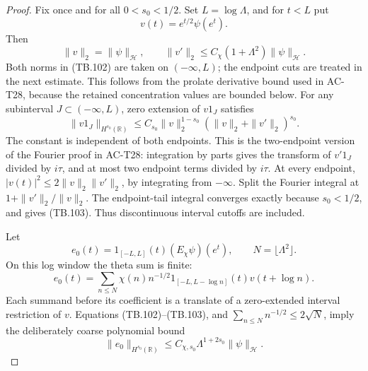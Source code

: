 \begin{proof}
Fix once and for all \(0<s_0<1/2\).
Set \(L=\log\Lambda\), and for \(t<L\) put
\[
             v(t)=e^{t/2}\psi(e^t).
 \]
Then
\[
 \|v\|_2=\|\psi\|_{\mathcal H},\qquad
 \|v'\|_2\leq C_\chi(1+\Lambda^2)\|\psi\|_{\mathcal H}.
 \tag{TB.102}
\]
Both norms in (TB.102) are taken on \((-\infty,L)\);
the endpoint cuts are treated in the next estimate.
This follows from the prolate derivative bound used in
AC-T28, because the retained concentration values are
bounded below.
For any subinterval \(J\subset(-\infty,L)\), zero extension
of \(v1_J\) satisfies
\[
 \|v1_J\|_{H^{s_0}(\mathbb R)}
      \leq C_{s_0}
        \|v\|_2^{1-s_0}(\|v\|_2+\|v'\|_2)^{s_0}.
 \tag{TB.103}
\]
The constant is independent of both endpoints.
This is the two-endpoint version of the Fourier proof
in AC-T28: integration by parts gives the transform of
\(v'1_J\) divided by \(i\tau\), and at most two endpoint
terms divided by \(i\tau\).
At every endpoint,
\(|v(t)|^2\leq2\|v\|_2\|v'\|_2\), by integrating from
\(-\infty\).
Split the Fourier integral at
\(1+\|v'\|_2/\|v\|_2\).
The endpoint-tail integral converges exactly because
\(s_0<1/2\), and gives (TB.103).
Thus discontinuous interval cutoffs are included.

Let
\[
 e_0(t)=1_{[-L,L]}(t)(E_\chi\psi)(e^t),
               \qquad N=\lfloor\Lambda^2\rfloor .
 \]
On this log window the theta sum is finite:
\[
 e_0(t)=\sum_{n\leq N}\chi(n)n^{-1/2}
        1_{[-L,L-\log n]}(t)v(t+\log n).
 \tag{TB.104}
\]
Each summand before its coefficient is a translate of
a zero-extended interval restriction of \(v\).
Equations (TB.102)--(TB.103), and
\(\sum_{n\leq N}n^{-1/2}\leq2\sqrt N\), imply the
deliberately coarse polynomial bound
\[
 \|e_0\|_{H^{s_0}(\mathbb R)}
          \leq C_{\chi,s_0}
                 \Lambda^{1+2s_0}\|\psi\|_{\mathcal H}.
 \tag{TB.105}
\]


\end{proof}
